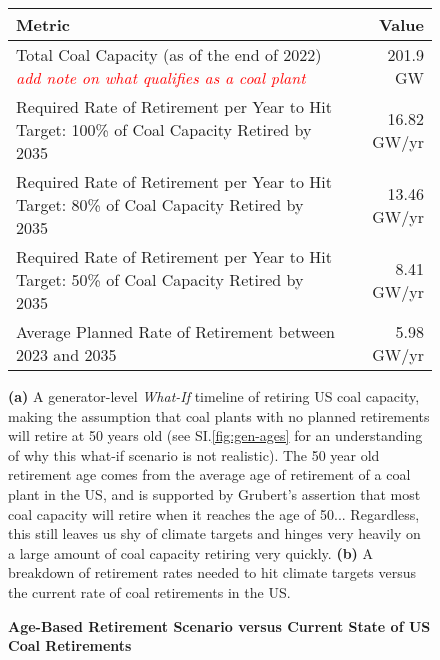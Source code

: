 \begin{figure}[htb]
    \centering
    \begin{minipage}{1\textwidth}
          
    \end{minipage}

    \begin{minipage}{1\textwidth}
    \begin{adjustbox}{width=\textwidth}
        \begin{small}
        \begin{tabular}{|l | r |}
            \hline
            \textbf{Metric} & \textbf{Value} \\
            \hline\hline
            Total Coal Capacity (as of the end of 2022) \textcolor{red}{\textit{add note on what qualifies as a coal plant}} & 201.9 GW\\
            \hline
            Required Rate of Retirement per Year to Hit Target: 100\% of Coal Capacity Retired by 2035 & 16.82 GW/yr\\
            \hline
            Required Rate of Retirement per Year to Hit Target: 80\% of Coal Capacity Retired by 2035 & 13.46 GW/yr\\
            \hline
            Required Rate of Retirement per Year to Hit Target: 50\% of Coal Capacity Retired by 2035 & 8.41 GW/yr\\
            \hline
            Average Planned Rate of Retirement between 2023 and 2035 & 5.98 GW/yr\\
            \hline
        \end{tabular}
    \end{small}
    \end{adjustbox}
    \end{minipage}

    \caption{\textbf{Age-Based Retirement Scenario versus Current State of US Coal Retirements}}
    \medskip
    \footnotesize

    \textbf{(a)} A generator-level \textit{What-If} timeline of retiring US coal capacity, making the assumption that coal plants with no planned retirements will retire at 50 years old (see SI.\ref{fig:gen-ages} for an understanding of why this what-if scenario is not realistic).
    The 50 year old retirement age comes from the average age of retirement of a coal plant in the US, and is supported by Grubert's assertion that most coal capacity will retire when it reaches the age of 50...
    Regardless, this still leaves us shy of climate targets and hinges very heavily on a large amount of coal capacity retiring very quickly.
    \textbf{(b)} A breakdown of retirement rates needed to hit climate targets versus the current rate of coal retirements in the US.

    \label{fig:ret_timeline}
\end{figure}


